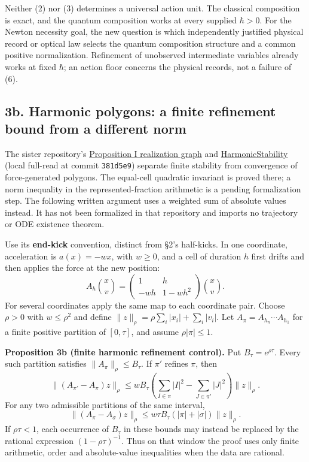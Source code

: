 \documentclass[11pt,a4paper]{article}
\begin{document}
Neither (2) nor (3) determines a universal action unit. The classical
composition is exact, and the quantum composition works at every
supplied \(\hbar>0\). For the Newton necessity goal, the new question is
which independently justified physical record or optical law selects the
quantum composition structure and a common positive normalization.
Refinement of unobserved intermediate variables already works at fixed
\(\hbar\); an action floor concerns the physical records, not a failure
of (6).

\hypertarget{b.-harmonic-polygons-a-finite-refinement-bound-from-a-different-norm}{%
\subsection{3b. Harmonic polygons: a finite refinement bound from a
different
norm}\label{b.-harmonic-polygons-a-finite-refinement-bound-from-a-different-norm}}

The sister repository's
\href{https://github.com/arivero/newtonlean/blob/381d5e9/research/PROP_I_REALIZATION.md}{Proposition
I realization graph} and
\href{https://github.com/arivero/newtonlean/blob/381d5e9/NewtonLimitDynamics/Polygon/HarmonicStability.lean}{HarmonicStability}
(local full-read at commit \texttt{381d5e9}) separate finite stability
from convergence of force-generated polygons. The equal-cell quadratic
invariant is proved there; a norm inequality in the represented-fraction
arithmetic is a pending formalization step. The following written
argument uses a weighted sum of absolute values instead. It has not been
formalized in that repository and imports no trajectory or ODE existence
theorem.

Use its \textbf{end-kick} convention, distinct from §2's half-kicks. In
one coordinate, acceleration is \(a(x)=-wx\), with \(w\ge0\), and a cell
of duration \(h\) first drifts and then applies the force at the new
position: \[A_h\binom{x}{v}
=\begin{pmatrix}1&h\\-wh&1-wh^2\end{pmatrix}\binom{x}{v}.
\tag{6a}\] For several coordinates apply the same map to each coordinate
pair. Choose \(\rho>0\) with \(w\le\rho^2\) and define
\(\|z\|_\rho=\rho\sum_i|x_i|+\sum_i|v_i|\). Let
\(A_\pi=A_{h_n}\cdots A_{h_1}\) for a finite positive partition of
\([0,\tau]\), and assume \(\rho|\pi|\le1\).

\textbf{Proposition 3b (finite harmonic refinement control).} Put
\(B_\tau=e^{\rho\tau}\). Every such partition satisfies
\(\|A_\pi\|_\rho\le B_\tau\). If \(\pi'\) refines \(\pi\), then
\[\|(A_{\pi'}-A_\pi)z\|_\rho
\le wB_\tau\left(\sum_{I\in\pi}|I|^2
                    -\sum_{J\in\pi'}|J|^2\right)\|z\|_\rho.
\tag{6b}\] For any two admissible partitions of the same interval,
\[\|(A_\pi-A_\sigma)z\|_\rho
\le w\tau B_\tau(|\pi|+|\sigma|)\|z\|_\rho.
\tag{6c}\] If \(\rho\tau<1\), each occurrence of \(B_\tau\) in these
bounds may instead be replaced by the rational expression
\((1-\rho\tau)^{-1}\). Thus on that window the proof uses only finite
arithmetic, order and absolute-value inequalities when the data are
rational.
\end{document}
